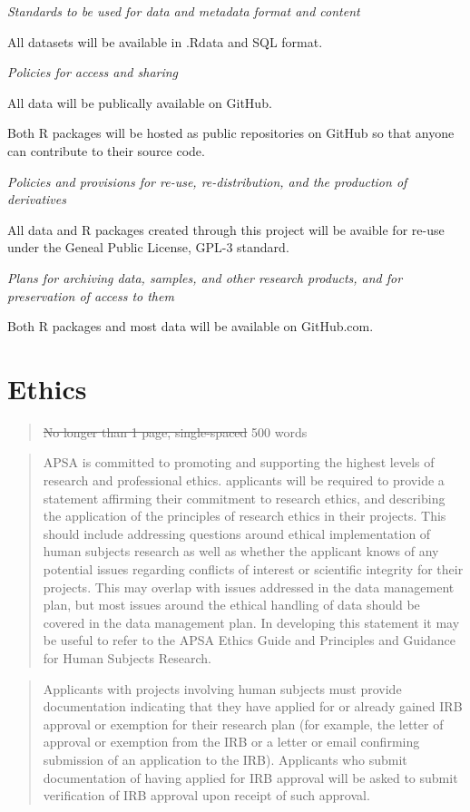 \documentclass[
      12pt,
        ]{article}
\begin{document}
\emph{Standards to be used for data and metadata format and content}

All datasets will be available in .Rdata and SQL format.

\emph{Policies for access and sharing}

All data will be publically available on GitHub.

Both R packages will be hosted as public repositories on GitHub so that anyone can contribute to their source code.

\emph{Policies and provisions for re-use, re-distribution, and the production of derivatives}

All data and R packages created through this project will be avaible for re-use under the Geneal Public License, GPL-3 standard.

\emph{Plans for archiving data, samples, and other research products, and for preservation of access to them}

Both R packages and most data will be available on GitHub.com.

\newpage

\hypertarget{ethics}{%
\section{Ethics}\label{ethics}}

\begin{quote}
\sout{No longer than 1 page, single-spaced} 500 words
\end{quote}

\begin{quote}
APSA is committed to promoting and supporting the highest levels of research and professional ethics. applicants will be required to provide a statement affirming their commitment to research ethics, and describing the application of the principles of research ethics in their projects. This should include addressing questions around ethical implementation of human subjects research as well as whether the applicant knows of any potential issues regarding conflicts of interest or scientific integrity for their projects. This may overlap with issues addressed in the data management plan, but most issues around the ethical handling of data should be covered in the data management plan. In developing this statement it may be useful to refer to the APSA Ethics Guide and Principles and Guidance for Human Subjects Research.
\end{quote}

\begin{quote}
Applicants with projects involving human subjects must provide documentation indicating that they have applied for or already gained IRB approval or exemption for their research plan (for example, the letter of approval or exemption from the IRB or a letter or email confirming submission of an application to the IRB). Applicants who submit documentation of having applied for IRB approval will be asked to submit verification of IRB approval upon receipt of such approval.
\end{quote}
\end{document}
